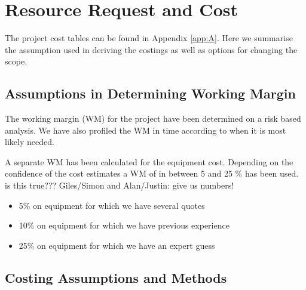 \section{Resource Request and Cost}

The project cost tables can be found in Appendix \ref{app:A}. Here we summarise the assumption used in deriving the costings as well as options for changing the scope.

\subsection{Assumptions in Determining Working Margin}

The working margin (WM) for the project have been determined on a risk based analysis. We have also profiled the WM in time according to when it is most likely needed.

A separate WM has been calculated for the equipment cost. Depending on the confidence of the cost estimates a WM of in between 5 and 25 \% has been used.
{\color{red} is this true??? Giles/Simon and Alan/Justin: give us numbers!}
\begin{itemize}
    \item  5\% on equipment for which we have several quotes
    \item 10\% on equipment for which we have previous experience
    \item 25\% on equipment for which we have an expert guess
\end{itemize}

\subsection{Costing Assumptions and Methods}

